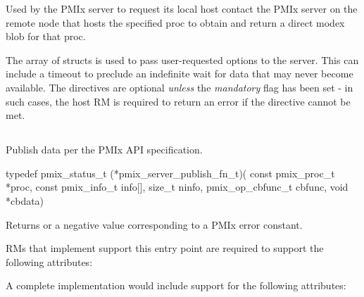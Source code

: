 Used by the PMIx server to request its local host contact the PMIx server on the remote node that hosts the specified proc to obtain and return a direct modex blob for that proc.

The array of  structs is used to pass user-requested options to the server.
This can include a timeout to preclude an indefinite wait for data that may never become available.
The directives are optional \emph{unless} the \emph{mandatory} flag has been set - in such cases, the host \ac{RM} is required to return an error if the directive cannot be met.


\subsection{}

\summary

Publish data per the PMIx API specification.

\format

\cspecificstart
\begin{codepar}
typedef pmix_status_t (*pmix_server_publish_fn_t)(
                             const pmix_proc_t *proc,
                             const pmix_info_t info[], size_t ninfo,
                             pmix_op_cbfunc_t cbfunc, void *cbdata)
\end{codepar}
\cspecificend

\begin{arglist}
\end{arglist}

Returns  or a negative value corresponding to a PMIx error constant.

\reqattr
\acp{RM} that implement support this entry point are required to support the following attributes:


\optattr
A complete implementation would include support for the following attributes:


